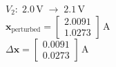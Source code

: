 \documentclass[border=10pt]{standalone}
\begin{document}
\color{weeknavy}
\parbox{10.5cm}{\centering
$\displaystyle V_{2}:\;2.0\,\mathrm V\;\longrightarrow\;2.1\,\mathrm V$\\[7pt]
$\displaystyle \mathbf{x}_{\mathrm{perturbed}}=\begin{bmatrix}2.0091\\1.0273\end{bmatrix}\,\mathrm A$\\[7pt]
$\displaystyle \Delta\mathbf{x}=\begin{bmatrix}0.0091\\0.0273\end{bmatrix}\,\mathrm A$
}
\end{document}
